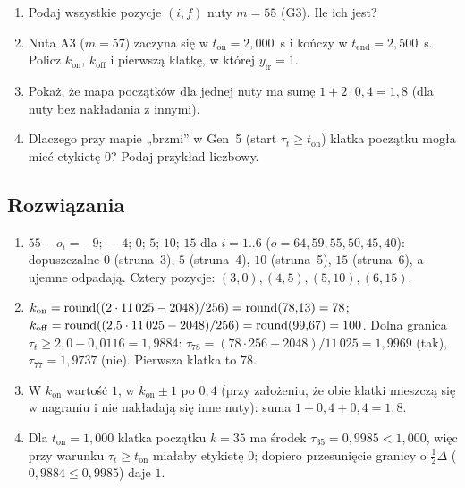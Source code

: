 \begin{sprawdz}
\begin{enumerate}
\item Podaj wszystkie pozycje $(i,f)$ nuty $m=55$ (G3). Ile ich jest?
\item Nuta A3 ($m=57$) zaczyna się w $t_\mathrm{on}=2{,}000$~s i kończy w $t_\mathrm{end}=2{,}500$~s. Policz $k_\mathrm{on}$, $k_\mathrm{off}$ i pierwszą klatkę, w której $y_\mathrm{fr}=1$.
\item Pokaż, że mapa początków dla jednej nuty ma sumę $1+2\cdot0{,}4=1{,}8$ (dla nuty bez nakładania z innymi).
\item Dlaczego przy mapie „brzmi” w Gen~5 (start $\tau_t\ge t_\mathrm{on}$) klatka początku mogła mieć etykietę $0$? Podaj przykład liczbowy.
\end{enumerate}
\end{sprawdz}

\subsection*{Rozwiązania}
\begin{enumerate}
\item $55-o_i=-9;\,-4;\,0;\,5;\,10;\,15$ dla $i=1..6$ ($o=64,59,55,50,45,40$): dopuszczalne $0$ (struna~3), $5$ (struna~4), $10$ (struna~5), $15$ (struna~6), a ujemne odpadają. Cztery pozycje: $(3,0),(4,5),(5,10),(6,15)$.
\item $k_\mathrm{on}=\operatorname{round}((2\cdot11\,025-2048)/256)=\operatorname{round}(78{,}13)=78$; $k_\mathrm{off}=\operatorname{round}((2{,}5\cdot11\,025-2048)/256)=\operatorname{round}(99{,}67)=100$. Dolna granica $\tau_t\ge2{,}0-0{,}0116=1{,}9884$: $\tau_{78}=(78\cdot256+2048)/11\,025=1{,}9969$ (tak), $\tau_{77}=1{,}9737$ (nie). Pierwsza klatka to $78$.
\item W $k_\mathrm{on}$ wartość $1$, w $k_\mathrm{on}\pm1$ po $0{,}4$ (przy założeniu, że obie klatki mieszczą się w nagraniu i nie nakładają się inne nuty): suma $1+0{,}4+0{,}4=1{,}8$.
\item Dla $t_\mathrm{on}=1{,}000$ klatka początku $k=35$ ma środek $\tau_{35}=0{,}9985<1{,}000$, więc przy warunku $\tau_t\ge t_\mathrm{on}$ miałaby etykietę $0$; dopiero przesunięcie granicy o $\tfrac12\Delta$ ($0{,}9884\le0{,}9985$) daje $1$.
\end{enumerate}
